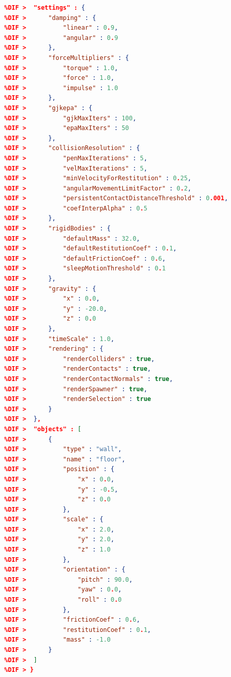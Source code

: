 \documentclass[12pt,a4paper]{report}
\begin{document}
\begin{appendices}
		\begin{lstlisting}[language=json, label={code:json_full}, caption={toate setarile disponibile pentru o scena in format .json}, float, floatplacement=t,alsolanguage=DIFcode]
		%DIF > {
		%DIF > 	"settings" : {
		%DIF > 		"damping" : {
		%DIF > 			"linear" : 0.9,
		%DIF > 			"angular" : 0.9
		%DIF > 		},
		%DIF > 		"forceMultipliers" : {
		%DIF > 			"torque" : 1.0,
		%DIF > 			"force" : 1.0,
		%DIF > 			"impulse" : 1.0
		%DIF > 		},
		%DIF > 		"gjkepa" : {
		%DIF > 			"gjkMaxIters" : 100,
		%DIF > 			"epaMaxIters" : 50
		%DIF > 		},
		%DIF > 		"collisionResolution" : {
		%DIF > 			"penMaxIterations" : 5,
		%DIF > 			"velMaxIterations" : 5,
		%DIF > 			"minVelocityForRestitution" : 0.25,
		%DIF > 			"angularMovementLimitFactor" : 0.2,
		%DIF > 			"persistentContactDistanceThreshold" : 0.001,
		%DIF > 			"coefInterpAlpha" : 0.5
		%DIF > 		},
		%DIF > 		"rigidBodies" : {
		%DIF > 			"defaultMass" : 32.0,
		%DIF > 			"defaultRestitutionCoef" : 0.1,
		%DIF > 			"defaultFrictionCoef" : 0.6,
		%DIF > 			"sleepMotionThreshold" : 0.1
		%DIF > 		},
		%DIF > 		"gravity" : {
		%DIF > 			"x" : 0.0,
		%DIF > 			"y" : -20.0,
		%DIF > 			"z" : 0.0
		%DIF > 		},
		%DIF > 		"timeScale" : 1.0,
		%DIF > 		"rendering" : {
		%DIF > 			"renderColliders" : true,
		%DIF > 			"renderContacts" : true,
		%DIF > 			"renderContactNormals" : true,
		%DIF > 			"renderSpawner" : true,
		%DIF > 			"renderSelection" : true
		%DIF > 		}
		%DIF > 	},
		%DIF > 	"objects" : [
		%DIF > 		{
		%DIF > 			"type" : "wall",
		%DIF > 			"name" : "floor",
		%DIF > 			"position" : {
		%DIF > 				"x" : 0.0,
		%DIF > 				"y" : -0.5,
		%DIF > 				"z" : 0.0
		%DIF > 			},
		%DIF > 			"scale" : {
		%DIF > 				"x" : 2.0,
		%DIF > 				"y" : 2.0,
		%DIF > 				"z" : 1.0
		%DIF > 			},
		%DIF > 			"orientation" : {
		%DIF > 				"pitch" : 90.0,
		%DIF > 				"yaw" : 0.0,
		%DIF > 				"roll" : 0.0
		%DIF > 			},
		%DIF > 			"frictionCoef" : 0.6,
		%DIF > 			"restitutionCoef" : 0.1,
		%DIF > 			"mass" : -1.0
		%DIF > 		}
		%DIF > 	]
		%DIF > }
		\end{lstlisting}
		

\end{appendices}
\end{document}
